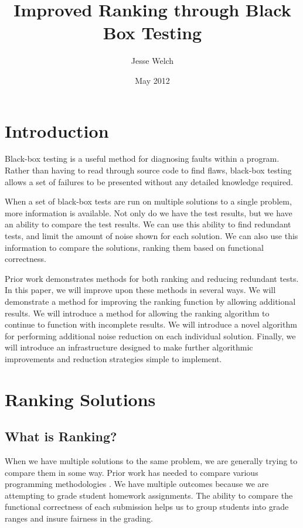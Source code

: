 \documentclass[11pt,twoside]{article}
\title{Improved Ranking through Black Box Testing}
\author{Jesse Welch}
\date{May 2012}
\let\cite=\citep
\begin{document}
\baselineskip %

\maketitle

\tableofcontents
\newpage

\section{Introduction}
Black-box testing is a useful method for diagnosing faults within a program. Rather than having to read through source code to find flaws, black-box testing allows a set of failures to be presented without any detailed knowledge required.

When a set of black-box tests are run on multiple solutions to a single problem, more information is available. Not only do we have the test results, but we have an ability to compare the test results. We can use this ability to find redundant tests, and limit the amount of noise shown for each solution. We can also use this information to compare the solutions, ranking them based on functional correctness.

Prior work demonstrates methods for both ranking and reducing redundant tests. In this paper, we will improve upon these methods in several ways. We will demonstrate a method for improving the ranking function by allowing additional results. We will introduce a method for allowing the ranking algorithm to continue to function with incomplete results. We will introduce a novel algorithm for performing additional noise reduction on each individual solution. Finally, we will introduce an infrastructure designed to make further algorithmic improvements and reduction strategies simple to implement.

\section{Ranking Solutions}
\subsection{What is Ranking?}
When we have multiple solutions to the same problem, we are generally trying to compare them in some way. Prior work has needed to compare various programming methodologies \cite{Claessen}. We have multiple outcomes because we are attempting to grade student homework assignments. The ability to compare the functional correctness of each submission helps us to group students into grade ranges and insure fairness in the grading.
\end{document}
